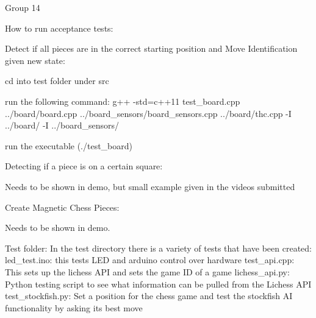 Group 14

How to run acceptance tests\+:

Detect if all pieces are in the correct starting position and Move Identification given new state\+:


\begin{DoxyEnumerate}
\item cd into test folder under src
\item run the following command\+: g++ -\/std=c++11 test\+\_\+board.\+cpp ../board/board.cpp ../board\+\_\+sensors/board\+\_\+sensors.cpp ../board/thc.cpp -\/I ../board/ -\/I ../board\+\_\+sensors/
\item run the executable (./test\+\_\+board)
\end{DoxyEnumerate}

Detecting if a piece is on a certain square\+:

Needs to be shown in demo, but small example given in the videos submitted

Create Magnetic Chess Pieces\+:

Needs to be shown in demo.

Test folder\+: In the test directory there is a variety of tests that have been created\+: led\+\_\+test.\+ino\+: this tests LED and arduino control over hardware test\+\_\+api.\+cpp\+: This sets up the lichess API and sets the game ID of a game lichess\+\_\+api.\+py\+: Python testing script to see what information can be pulled from the Lichess API test\+\_\+stockfish.\+py\+: Set a position for the chess game and test the stockfish AI functionality by asking its best move 